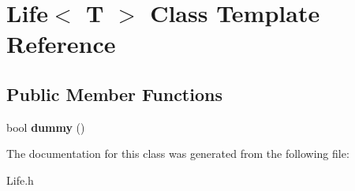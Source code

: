 \hypertarget{classLife}{\section{Life$<$ T $>$ Class Template Reference}
\label{classLife}
}
\subsection*{Public Member Functions}
\begin{DoxyCompactItemize}
\item 
\hypertarget{classLife_a60b41df48d4ec6b010cd1197ad8684d0}{bool {\bfseries dummy} ()}\label{classLife_a60b41df48d4ec6b010cd1197ad8684d0}

\end{DoxyCompactItemize}


The documentation for this class was generated from the following file\+:\begin{DoxyCompactItemize}
\item 
Life.\+h\end{DoxyCompactItemize}
